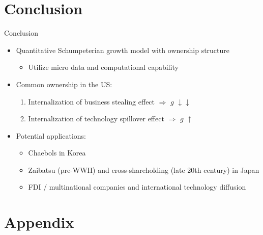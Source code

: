 \documentclass[
  10pt,               %
  aspectratio=169,    %
  handout             %
]{beamer}
\theoremstyle{plain}
\begin{document}
\section{Conclusion}
\begin{frame}{Conclusion}
  \begin{itemize}
    \item Quantitative Schumpeterian growth model with ownership structure
          \begin{itemize}
            \item Utilize micro data and computational capability
          \end{itemize}
          \medskip{}
    \item Common ownership in the US:
          \begin{enumerate}
            \item Internalization of business stealing effect $\Longrightarrow$ $g$ $\downarrow$$\downarrow$
            \item Internalization of technology spillover effect $\Longrightarrow$ $g$ $\uparrow$
          \end{enumerate}
          \medskip{}
    \item Potential applications:
          \begin{itemize}
            \item Chaebols in Korea
            \item Zaibatsu (pre-WWII) and cross-shareholding (late 20th century) in Japan
            \item FDI / multinational companies and international technology diffusion
          \end{itemize}
  \end{itemize}
\end{frame}

\appendix

\section{Appendix}
\end{document}

